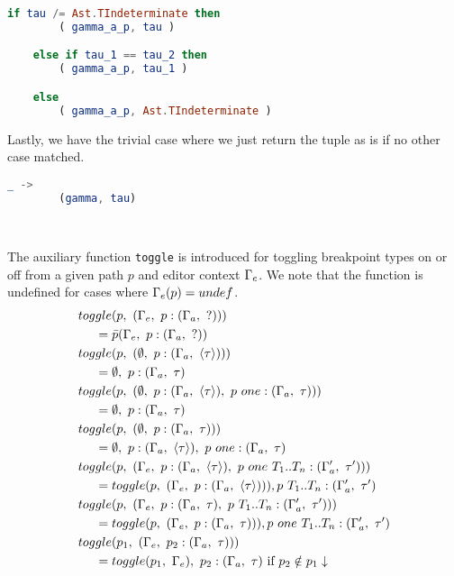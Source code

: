 \begin{lstlisting}[language=elm,%
    gobble=4,%
    ]
    if tau /= Ast.TIndeterminate then
        ( gamma_a_p, tau )

    else if tau_1 == tau_2 then
        ( gamma_a_p, tau_1 )

    else
        ( gamma_a_p, Ast.TIndeterminate )
\end{lstlisting}

Lastly, we have the trivial case where we just return the tuple as is if no
other case matched.

\begin{lstlisting}[language=elm,%
    gobble=4,%
    ]
    _ ->
        (gamma, tau)
\end{lstlisting}
~

The auxiliary function \texttt{toggle} is introduced for toggling breakpoint
types on or off from a given path $p$ and editor context $\Gamma_{e}$. We note
that the function is undefined for cases where $\Gamma_{e}(p) = undef$.
\begin{align*}
    &toggle(p,~(\Gamma_{e},~p : (\Gamma_{a},~?))) \\
    &~~~~= \bar{p}(\Gamma_{e},~p : (\Gamma_{a},~?)) \\
    &toggle(p,~(\emptyset,~p : (\Gamma_{a},~\langle \tau \rangle))) \\
    &~~~~= \emptyset,~p : (\Gamma_{a},~\tau) \\
    &toggle(p,~(\emptyset,~p : (\Gamma_{a},~\langle \tau \rangle),~p~one : (\Gamma_{a},~\tau))) \\
    &~~~~= \emptyset,~p : (\Gamma_{a},~\tau) \\
    &toggle(p,~(\emptyset,~p : (\Gamma_{a},~\tau))) \\
    &~~~~= \emptyset,~p : (\Gamma_{a},~\langle \tau \rangle),~p~one : (\Gamma_{a},~\tau) \\
    &toggle(p,~(\Gamma_{e},~p : (\Gamma_{a},~\langle \tau \rangle),~p~one~T_1..T_n : (\Gamma_{a}^\prime,~\tau^\prime))) \\
    &~~~~= toggle(p,~(\Gamma_{e},~p : (\Gamma_{a},~\langle \tau \rangle))), p~T_1..T_n : (\Gamma_{a}^\prime,~\tau^\prime) \\
    &toggle(p,~(\Gamma_{e},~p : (\Gamma_{a},~\tau),~p~T_1..T_n : (\Gamma_{a}^\prime,~\tau^\prime))) \\
    &~~~~= toggle(p,~(\Gamma_{e},~p : (\Gamma_{a},~\tau))), p~one~T_1..T_n : (\Gamma_{a}^\prime,~\tau^\prime) \\
    &toggle(p_1,~(\Gamma_{e},~p_2 : (\Gamma_{a},~\tau))) \\
    &~~~~= toggle(p_1,~\Gamma_{e}),~p_2 : (\Gamma_{a},~\tau)\text{ if }p_2 \notin p_1 \downarrow
\end{align*}

